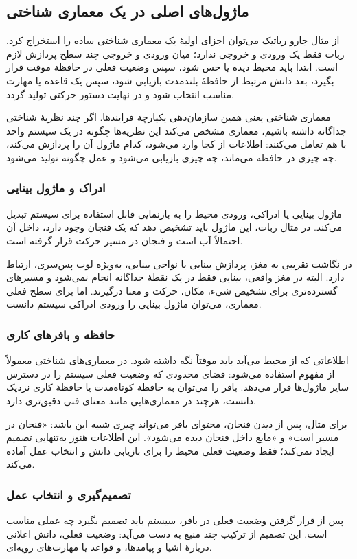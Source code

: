 \subsection{ماژول‌های اصلی در یک معماری شناختی}
از مثال جارو رباتیک می‌توان اجزای اولیهٔ یک معماری شناختی ساده را استخراج کرد. ربات فقط یک ورودی و خروجی ندارد؛ میان ورودی و خروجی چند سطح پردازش لازم است. ابتدا باید محیط دیده یا حس شود، سپس وضعیت فعلی در حافظهٔ موقت قرار بگیرد، بعد دانش مرتبط از حافظهٔ بلندمدت بازیابی شود، سپس یک قاعده یا مهارت مناسب انتخاب شود و در نهایت دستور حرکتی تولید گردد.

معماری شناختی یعنی همین سازمان‌دهی یکپارچهٔ فرایندها. اگر چند نظریهٔ شناختی جداگانه داشته باشیم، معماری مشخص می‌کند این نظریه‌ها چگونه در یک سیستم واحد با هم تعامل می‌کنند: اطلاعات از کجا وارد می‌شود، کدام ماژول آن را پردازش می‌کند، چه چیزی در حافظه می‌ماند، چه چیزی بازیابی می‌شود و عمل چگونه تولید می‌شود.

\subsubsection{ادراک و ماژول بینایی}
ماژول بینایی یا ادراکی، ورودی محیط را به بازنمایی قابل استفاده برای سیستم تبدیل می‌کند. در مثال ربات، این ماژول باید تشخیص دهد که یک فنجان وجود دارد، داخل آن احتمالاً آب است و فنجان در مسیر حرکت قرار گرفته است.

در نگاشت تقریبی به مغز، پردازش بینایی با نواحی بینایی، به‌ویژه لوب پس‌سری، ارتباط دارد. البته در مغز واقعی، بینایی فقط در یک نقطهٔ جداگانه انجام نمی‌شود و مسیرهای گسترده‌تری برای تشخیص شیء، مکان، حرکت و معنا درگیرند. اما برای سطح فعلی معماری، می‌توان ماژول بینایی را ورودی ادراکی سیستم دانست.

\subsubsection{حافظه و بافرهای کاری}
اطلاعاتی که از محیط می‌آید باید موقتاً نگه داشته شود. در معماری‌های شناختی معمولاً از مفهوم  استفاده می‌شود: فضای محدودی که وضعیت فعلی سیستم را در دسترس سایر ماژول‌ها قرار می‌دهد. بافر را می‌توان به حافظهٔ کوتاه‌مدت یا حافظهٔ کاری نزدیک دانست، هرچند در معماری‌هایی مانند  معنای فنی دقیق‌تری دارد.

برای مثال، پس از دیدن فنجان، محتوای بافر می‌تواند چیزی شبیه این باشد: «فنجان در مسیر است» و «مایع داخل فنجان دیده می‌شود». این اطلاعات هنوز به‌تنهایی تصمیم ایجاد نمی‌کند؛ فقط وضعیت فعلی محیط را برای بازیابی دانش و انتخاب عمل آماده می‌کند.

\subsubsection{تصمیم‌گیری و انتخاب عمل}
پس از قرار گرفتن وضعیت فعلی در بافر، سیستم باید تصمیم بگیرد چه عملی مناسب است. این تصمیم از ترکیب چند منبع به دست می‌آید: وضعیت فعلی، دانش اعلانی دربارهٔ اشیا و پیامدها، و قواعد یا مهارت‌های رویه‌ای.

